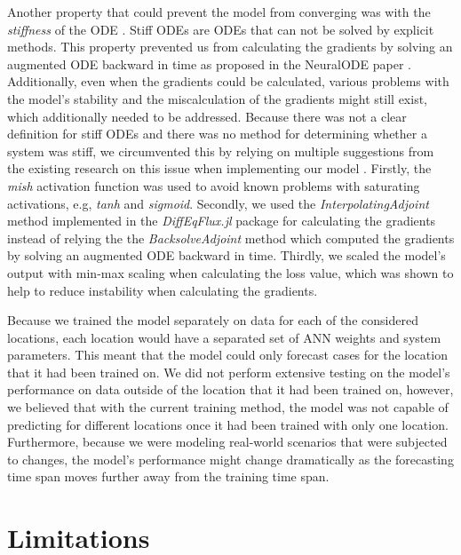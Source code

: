 Another property that could prevent the model from converging was with the \textit{stiffness} of the \gls{ODE} \cite{kimStiffNeuralOrdinary2021}.
Stiff \glspl{ODE} are \glspl{ODE} that can not be solved by explicit methods.
This property prevented us from calculating the gradients by solving an augmented \gls{ODE} backward in time as proposed in the \gls{NeuralODE} paper \cite{chenNeuralOrdinaryDifferential2019}.
Additionally, even when the gradients could be calculated, various problems with the model's stability and the miscalculation of the gradients might still exist, which additionally needed to be addressed.
Because there was not a clear definition for stiff \glspl{ODE} and there was no method for determining whether a system was stiff, we circumvented this by relying on multiple suggestions from the existing research on this issue when implementing our model \cite{kimStiffNeuralOrdinary2021}.
Firstly, the \textit{mish} activation function \cite{misraMishSelfRegularized2020} was used to avoid known problems with saturating activations, e.g, \textit{tanh} and \textit{sigmoid}.
Secondly, we used the \textit{InterpolatingAdjoint} method implemented in the \textit{DiffEqFlux.jl} package for calculating the gradients instead of relying the the \textit{BacksolveAdjoint} method which computed the gradients by solving an augmented \gls{ODE} backward in time.
Thirdly, we scaled the model's output with min-max scaling when calculating the loss value, which was shown to help to reduce instability when calculating the gradients.

Because we trained the model separately on data for each of the considered locations, each location would have a separated set of \gls{ANN} weights and system parameters.
This meant that the model could only forecast cases for the location that it had been trained on.
We did not perform extensive testing on the model's performance on data outside of the location that it had been trained on, however, we believed that with the current training method, the model was not capable of predicting for different locations once it had been trained with only one location.
Furthermore, because we were modeling real-world scenarios that were subjected to changes, the model's performance might change dramatically as the forecasting time span moves further away from the training time span.

\section{Limitations}

